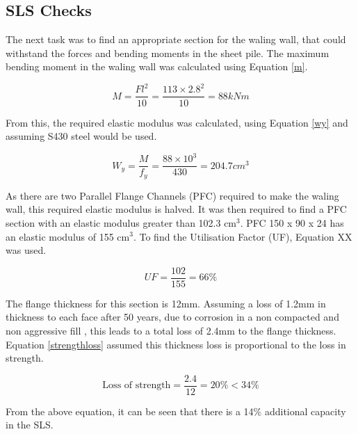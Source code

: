 \documentclass[12pt, a4paper]{article}
\begin{document}
\subsection{SLS Checks}
\begin{justify}
The next task was to find an appropriate section for the waling wall, that could withstand the forces and bending moments in the sheet pile. The maximum bending moment in the waling wall was calculated using Equation \ref{m}. 
\end{justify}
\begin{equation}
    M=\frac{Fl^2}{10}=\frac{113 \times 2.8^2}{10}=88kNm
    \label{m}
\end{equation}
\begin{justify}
From this, the required elastic modulus was calculated, using Equation \ref{wy} and assuming S430 steel would be used. 
\end{justify}
\begin{equation}
    W_y=\frac{M}{f_y}=\frac{88 \times10^3}{430}=204.7 cm^3
    \label{wy}
\end{equation}
\begin{justify}
As there are two Parallel Flange Channels (PFC) required to make the waling wall, this required elastic modulus is halved. It was then required to find a PFC section with an elastic modulus greater than 102.3 cm$^3$. PFC 150 x 90 x 24 has an elastic modulus of 155 cm$^3$. To find the Utilisation Factor (UF), Equation XX was used.
\end{justify}
\begin{equation}
    UF=\frac{102}{155}=66\%
\end{equation}
\begin{justify}
The flange thickness for this section is 12mm. Assuming a loss of 1.2mm in thickness to each face after 50 years, due to corrosion in a non compacted and non aggressive fill \cite{h}, this leads to a total loss of 2.4mm to the flange thickness. Equation \ref{strengthloss} assumed this thickness loss is proportional to the loss in strength.
\end{justify}

\begin{equation}
\text{Loss of strength}=\frac{2.4}{12}=20\%<34\%
\label{strengthloss}
\end{equation}

\begin{justify}
From the above equation, it can be seen that there is a 14\% additional capacity in the SLS.
\end{justify}
\end{document}
